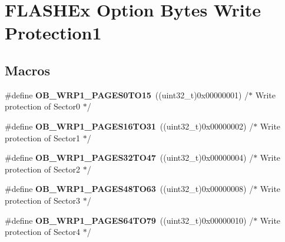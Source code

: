 \hypertarget{group___f_l_a_s_h_ex___option___bytes___write___protection1}{\section{F\-L\-A\-S\-H\-Ex Option Bytes Write Protection1}
\label{group___f_l_a_s_h_ex___option___bytes___write___protection1}
}
\subsection*{Macros}
\begin{DoxyCompactItemize}
\item 
\hypertarget{group___f_l_a_s_h_ex___option___bytes___write___protection1_ga42e432a1d2ce05a1b81e39031b179eeb}{\#define {\bfseries O\-B\-\_\-\-W\-R\-P1\-\_\-\-P\-A\-G\-E\-S0\-T\-O15}~((uint32\-\_\-t)0x00000001) /$\ast$ Write protection of Sector0 $\ast$/}\label{group___f_l_a_s_h_ex___option___bytes___write___protection1_ga42e432a1d2ce05a1b81e39031b179eeb}

\item 
\hypertarget{group___f_l_a_s_h_ex___option___bytes___write___protection1_ga2864e4b0975b4875032ab400f0db28db}{\#define {\bfseries O\-B\-\_\-\-W\-R\-P1\-\_\-\-P\-A\-G\-E\-S16\-T\-O31}~((uint32\-\_\-t)0x00000002) /$\ast$ Write protection of Sector1 $\ast$/}\label{group___f_l_a_s_h_ex___option___bytes___write___protection1_ga2864e4b0975b4875032ab400f0db28db}

\item 
\hypertarget{group___f_l_a_s_h_ex___option___bytes___write___protection1_gaa34e3505d6c7d97ea2397123d611121e}{\#define {\bfseries O\-B\-\_\-\-W\-R\-P1\-\_\-\-P\-A\-G\-E\-S32\-T\-O47}~((uint32\-\_\-t)0x00000004) /$\ast$ Write protection of Sector2 $\ast$/}\label{group___f_l_a_s_h_ex___option___bytes___write___protection1_gaa34e3505d6c7d97ea2397123d611121e}

\item 
\hypertarget{group___f_l_a_s_h_ex___option___bytes___write___protection1_ga12bfcafda35ca43d79955e0c2d47ab03}{\#define {\bfseries O\-B\-\_\-\-W\-R\-P1\-\_\-\-P\-A\-G\-E\-S48\-T\-O63}~((uint32\-\_\-t)0x00000008) /$\ast$ Write protection of Sector3 $\ast$/}\label{group___f_l_a_s_h_ex___option___bytes___write___protection1_ga12bfcafda35ca43d79955e0c2d47ab03}

\item 
\hypertarget{group___f_l_a_s_h_ex___option___bytes___write___protection1_gaec84f63434ebacd926e848a4ab99bdb4}{\#define {\bfseries O\-B\-\_\-\-W\-R\-P1\-\_\-\-P\-A\-G\-E\-S64\-T\-O79}~((uint32\-\_\-t)0x00000010) /$\ast$ Write protection of Sector4 $\ast$/}\label{group___f_l_a_s_h_ex___option___bytes___write___protection1_gaec84f63434ebacd926e848a4ab99bdb4}


\end{DoxyCompactItemize}
